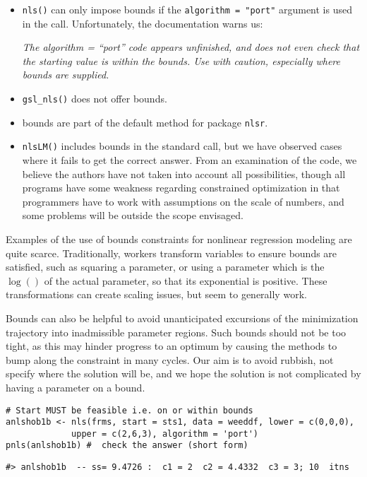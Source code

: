 \begin{itemize}
\item
  \texttt{nls()} can only impose bounds if the \texttt{algorithm\ =\ "port"} argument is
  used in the call. Unfortunately, the documentation warns us:

  \emph{The algorithm = ``port'' code appears unfinished, and does not even
  check that the starting value is within the bounds. Use with
  caution, especially where bounds are supplied.}
\item
  \texttt{gsl\_nls()} does not offer bounds.
\item
  bounds are part of the default method for package \texttt{nlsr}.
\item
  \texttt{nlsLM()} includes bounds in the standard call, but we have observed cases
  where it fails to get the correct answer. From an examination of the code,
  we believe the authors have not taken into account all possibilities, though
  all programs have some weakness regarding constrained optimization in that
  programmers have to work with assumptions on the scale of numbers,
  and some problems will be outside the scope envisaged.
\end{itemize}

Examples of the use of bounds constraints for nonlinear regression modeling are
quite scarce. Traditionally, workers transform variables to ensure bounds are
satisfied, such as squaring a parameter, or using a parameter which is the \(\log()\)
of the actual parameter, so that its exponential is positive. These transformations
can create scaling issues, but seem to generally work.

Bounds can also be helpful to avoid unanticipated excursions of the minimization
trajectory into inadmissible parameter regions. Such bounds should not be too
tight, as this may hinder progress to an optimum by causing the methods to
bump along the constraint in many cycles. Our aim is to avoid rubbish, not
specify where the solution will be, and we hope the solution is not complicated
by having a parameter on a bound.

\begin{verbatim}
# Start MUST be feasible i.e. on or within bounds
anlshob1b <- nls(frms, start = sts1, data = weeddf, lower = c(0,0,0),
             upper = c(2,6,3), algorithm = 'port')
pnls(anlshob1b) #  check the answer (short form)
\end{verbatim}

\begin{verbatim}
#> anlshob1b  -- ss= 9.4726 :  c1 = 2  c2 = 4.4332  c3 = 3; 10  itns
\end{verbatim}

